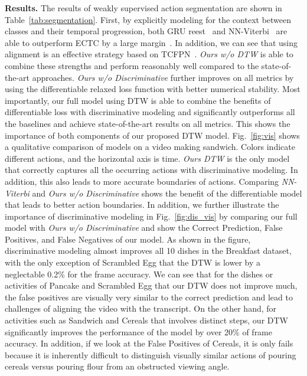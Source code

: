 \documentclass[10pt,twocolumn,letterpaper]{article}
\newcommand{\dttw}{DTW\xspace}
\begin{document}
{\noindent \bf Results.} The results of weakly supervised action segmentation are shown in Table~\ref{tab:segmentation}. First, by explicitly modeling for the context between classes and their temporal progression, both GRU reest~\cite{richard2017weakly} and NN-Viterbi~\cite{richard2018neuralnetwork} are able to outperform ECTC by a large margin~\cite{huang2016connectionist}. In addition, we can see that using alignment is an effective strategy based on TCFPN~\cite{ding2018weakly}. \emph{Ours w/o \dttw} is able to combine these strengths and perform reasonably well compared to the state-of-the-art approaches. \emph{Ours w/o Discriminative} further improves on all metrics by using the differentiable relaxed loss function with better numerical stability. Most importantly, our full model using \dttw is able to combine the benefits of differentiable loss with discriminative modeling and significantly outperforms all the baselines and achieve state-of-the-art results on all metrics. This shows the importance of both components of our proposed \dttw model. Fig.~\ref{fig:vis} shows a qualitative comparison of models on a video making sandwich. Colors indicate different actions, and the horizontal axis is time. \emph{Ours \dttw} is the only model that correctly captures all the occurring actions with discriminative modeling. In addition, this also leads to more accurate boundaries of actions. Comparing \emph{NN-Viterbi} and \emph{Ours w/o Discriminative} shows the benefit of the differentiable model that leads to better action boundaries. 
In addition, we further illustrate the importance of discriminative modeling in Fig.~\ref{fig:dis_vis} by comparing our full model with \emph{Ours w/o Discriminative} and show the Correct Prediction, False Positives, and False Negatives of our model. As shown in the figure, discriminative modeling almost improves all 10 dishes in the Breakfast dataset, with  the only exception of Scrambled Egg that the \dttw is lower by a neglectable 0.2\% for the frame accuracy. We can see that for the dishes or activities of Pancake and Scrambled Egg that our \dttw does not improve much, the false positives are visually very similar to the correct prediction and lead to challenges of aligning the video with the transcript. On the other hand, for activities such as Sandwich and Cereals that involves distinct steps, our \dttw significantly improves the performance of the model by over 20\% of frame accuracy. In addition, if we look at the False Positives of Cereals, it is only fails because it is inherently difficult to distinguish visually similar actions of pouring cereals versus pouring flour from an obstructed viewing angle.
\end{document}
